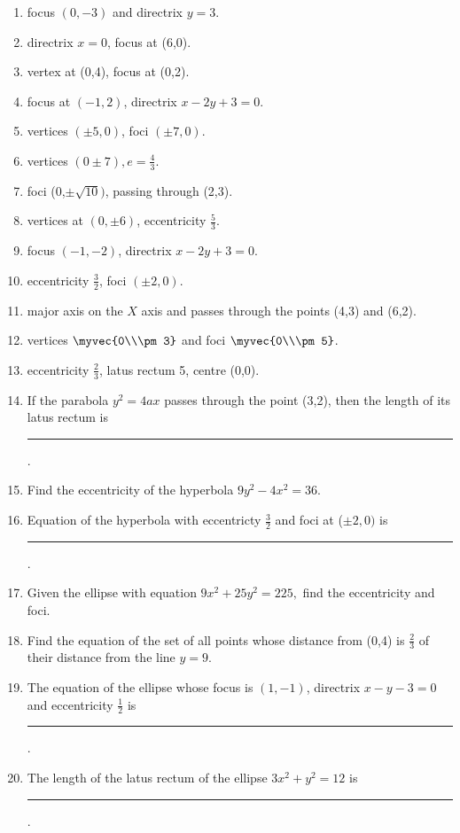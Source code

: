 \begin{enumerate}[label=\thesubsection.\arabic*,ref=\thesubsection.\theenumi,resume*]
\\
\solution

\item focus $(0,-3)$ and directrix $y=3$.
\item  directrix $x=0$, focus at (6,0).
\item  vertex  at (0,4), focus at (0,2).
\item  focus at $(-1,2)$, directrix $x-2y+3=0$.
	 \item  vertices $(\pm5,0)$, foci $(\pm 7,0)$.
	 \item vertices $(0\pm7), e =\frac{4}{3}$. 
	 \item  foci (0,$\pm\sqrt{10})$, passing through (2,3).
\item vertices at $(0,\pm6)$,  eccentricity $\frac{5}{3}$.
\item focus $(-1,-2)$,  directrix $x-2y+3=0$.
\item eccentricity $\frac{3}{2}$, foci $(\pm2,0)$.
\item major axis on the $X$ axis and passes through the points (4,3) and (6,2).
\\
\solution

\item vertices $\myvec{0\\\pm 3}$ and foci $\myvec{0\\\pm5}$.
	\\
\solution
		
 \item eccentricity $\frac{2}{3}$, latus rectum 5, centre  (0,0).
\item If the parabola $y^2=4ax$ passes through the point (3,2), then the length of its latus rectum is \rule{1cm}{0.1pt}.
\item Find the eccentricity of the hyperbola $9y^2-4x^2=36$.
\item Equation of the hyperbola with eccentricty $\frac{3}{2}$ and foci at ($\pm2,0)$ is \rule{1cm}{0.1pt}.
 \item Given the ellipse with equation $9x^2+25y^2=225,$ find the eccentricity and foci.
 \item Find the equation of the set of all points whose distance from (0,4) is $\frac{2}{3}$ of their distance from the line $y=9$.
\item The equation of the ellipse whose focus is $(1,-1)$, directrix $x-y-3
	=0$ and eccentricity $\frac{1}{2}$ is \rule{1cm}{0.1pt}.
\item The length of the latus rectum of the ellipse $3x^2+y^2=12$ is \rule{1cm}{0.1pt}.
\end{enumerate}

